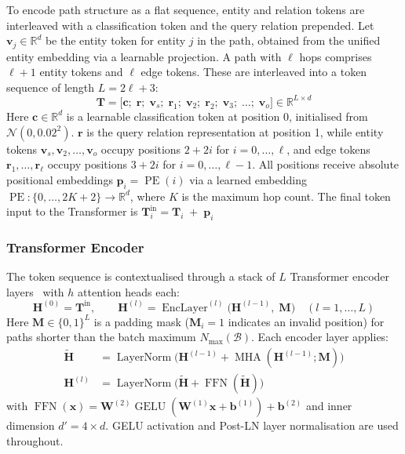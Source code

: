 \documentclass[runningheads]{llncs}
\begin{document}
To encode path structure as a flat sequence, entity and relation tokens are interleaved
with a classification token and the query relation prepended.
Let $\mathbf{v}_j \in \mathbb{R}^{d}$ be the entity token for entity $j$ in the path,
obtained from the unified entity embedding via a learnable projection.
A path with $\ell$ hops comprises $\ell+1$ entity tokens and $\ell$ edge tokens.
These are interleaved into a token sequence of length $L = 2\ell + 3$:
\begin{equation}
  \mathbf{T} = \bigl[\mathbf{c};\; \mathbf{r};\;
    \mathbf{v}_{s};\; \mathbf{r}_{1};\; \mathbf{v}_{2};\; \mathbf{r}_{2};\;
  \mathbf{v}_{3};\; \ldots;\; \mathbf{v}_{o}\bigr]
  \in \mathbb{R}^{L \times d}
  \label{eq:token-seq}
\end{equation}
Here $\mathbf{c} \in \mathbb{R}^{d}$ is a learnable classification token
at position 0, initialised from $\mathcal{N}(0, 0.02^2)$.
$\mathbf{r}$ is the query relation representation at position 1, while entity tokens
$\mathbf{v}_{s}, \mathbf{v}_{2}, \ldots, \mathbf{v}_{o}$ occupy positions $2 + 2i$
for $i = 0, \ldots, \ell$, and edge tokens $\mathbf{r}_{1}, \ldots, \mathbf{r}_{\ell}$
occupy positions $3 + 2i$ for $i = 0, \ldots, \ell - 1$.
All positions receive absolute positional embeddings
$\mathbf{p}_i = \operatorname{PE}(i)$ via a learned embedding
$\operatorname{PE}: \{0, \ldots, 2K+2\} \to \mathbb{R}^{d}$,
where $K$ is the maximum hop count.
The final token input to the Transformer is $\mathbf{T}^{\text{in}}_i = \mathbf{T}_i \;+\; \mathbf{p}_i$
\subsubsection{Transformer Encoder}

\label{sec:transformer-encoder}

The token sequence is contextualised through a stack of $L$
Transformer encoder layers~\cite{vaswani2017attention} with $h$ attention heads each:
\begin{equation}
  \mathbf{H}^{(0)} = \mathbf{T}^{\text{in}},\qquad
  \mathbf{H}^{(l)} = \operatorname{EncLayer}^{(l)}\bigl(\mathbf{H}^{(l-1)},\; \mathbf{M}\bigr)
  \quad (l = 1, \ldots, L)
  \label{eq:transformer}
\end{equation}
Here $\mathbf{M} \in \{0, 1\}^{L}$ is a padding mask ($\mathbf{M}_i = 1$ indicates an
invalid position) for paths shorter than the batch maximum $N_{\max}(\mathcal{B})$.
Each encoder layer applies:
\begin{align}
  \tilde{\mathbf{H}} &= \operatorname{LayerNorm}\bigl(
  \mathbf{H}^{(l-1)} + \operatorname{MHA}(\mathbf{H}^{(l-1)}; \mathbf{M})\bigr)
  \label{eq:attn}\\
  \mathbf{H}^{(l)} &= \operatorname{LayerNorm}\bigl(
  \tilde{\mathbf{H}} + \operatorname{FFN}(\tilde{\mathbf{H}})\bigr)
  \label{eq:ffn}
\end{align}
with $\operatorname{FFN}(\mathbf{x}) = \mathbf{W}^{(2)} \operatorname{GELU}(\mathbf{W}^{(1)} \mathbf{x} + \mathbf{b}^{(1)}) + \mathbf{b}^{(2)}$
and inner dimension $d' = 4 \times d$.
GELU \cite{hendrycks2016gaussian} activation
and Post-LN layer normalisation are used throughout.
\end{document}
